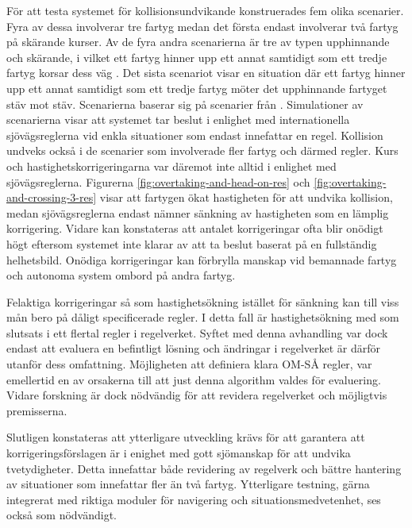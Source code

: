 För att testa systemet för kollisionsundvikande konstruerades fem olika scenarier. Fyra av dessa involverar tre fartyg medan det första endast involverar två fartyg på skärande kurser.  Av de fyra andra scenarierna är tre av typen upphinnande och skärande, i vilket ett fartyg hinner upp ett annat samtidigt som ett tredje fartyg korsar dess väg . Det sista scenariot visar en situation där ett fartyg hinner upp ett annat samtidigt som ett tredje fartyg möter det upphinnande fartyget stäv mot stäv.  Scenarierna baserar sig på scenarier från \textcite{ecolreg_overtaking-and-crossing,ecolreg_overtaking-and-crossing-3,ecolreg_overtaking-and-crossing-2,ecolreg_overtaking-and-head-on}.  Simulationer av scenarierna visar att systemet tar beslut i  enlighet med   internationella sjövägsreglerna vid enkla situationer som endast innefattar en regel.  Kollision undveks också i de scenarier som involverade fler fartyg och därmed regler. Kurs och hastighetskorrigeringarna var däremot inte alltid i enlighet med sjövägsreglerna. Figurerna \ref{fig:overtaking-and-head-on-res} och \ref{fig:overtaking-and-crossing-3-res} visar att fartygen ökat hastigheten för att undvika kollision, medan sjövägsreglerna endast nämner sänkning av hastigheten som en lämplig korrigering. Vidare kan konstateras att antalet korrigeringar ofta blir onödigt högt  eftersom systemet inte klarar av att ta beslut baserat på en fullständig helhetsbild.  Onödiga korrigeringar kan förbrylla manskap vid bemannade fartyg och  autonoma system ombord på andra fartyg.

Felaktiga korrigeringar så som  hastighetsökning istället för sänkning kan till viss mån  bero på dåligt specificerade regler. I detta fall är hastighetsökning med som slutsats i ett flertal regler i regelverket. Syftet med denna avhandling var dock endast att evaluera en befintligt lösning och ändringar i regelverket är därför utanför dess omfattning. Möjligheten att definiera klara OM-SÅ regler, var emellertid en av orsakerna till att just denna algorithm valdes för evaluering.  Vidare forskning är dock  nödvändig för att revidera regelverket och möjligtvis premisserna.


Slutligen konstateras att ytterligare utveckling krävs för att garantera att korrigeringsförslagen är i enighet med  gott sjömanskap för att undvika tvetydigheter. Detta innefattar både revidering av regelverk och bättre hantering av situationer som innefattar fler än två fartyg. Ytterligare testning, gärna integrerat med riktiga moduler för navigering och situationsmedvetenhet, ses också som nödvändigt.